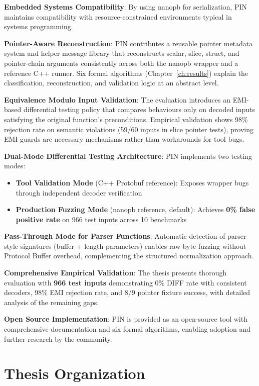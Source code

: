 \documentclass[doublespace,nopageskip]{VTthesis}
\begin{document}
\textbf{Embedded Systems Compatibility}: By using nanopb for serialization, PIN maintains compatibility with resource-constrained environments typical in systems programming.

\textbf{Pointer-Aware Reconstruction}: PIN contributes a reusable pointer metadata system and helper message library that reconstructs scalar, slice, struct, and pointer-chain arguments consistently across both the nanopb wrapper and a reference C++ runner. Six formal algorithms (Chapter~\ref{ch:results}) explain the classification, reconstruction, and validation logic at an abstract level.

\textbf{Equivalence Modulo Input Validation}: The evaluation introduces an EMI-based differential testing policy that compares behaviours only on decoded inputs satisfying the original function's preconditions. Empirical validation shows 98\% rejection rate on semantic violations (59/60 inputs in slice pointer tests), proving EMI guards are necessary mechanisms rather than workarounds for tool bugs.

\textbf{Dual-Mode Differential Testing Architecture}: PIN implements two testing modes:
\begin{itemize}
  \item \textbf{Tool Validation Mode} (C++ Protobuf reference): Exposes wrapper bugs through independent decoder verification
  \item \textbf{Production Fuzzing Mode} (nanopb reference, default): Achieves \textbf{0\% false positive rate} on 966 test inputs across 10 benchmarks
\end{itemize}

\textbf{Pass-Through Mode for Parser Functions}: Automatic detection of parser-style signatures (buffer + length parameters) enables raw byte fuzzing without Protocol Buffer overhead, complementing the structured normalization approach.

\textbf{Comprehensive Empirical Validation}: The thesis presents thorough evaluation with \textbf{966 test inputs} demonstrating 0\% DIFF rate with consistent decoders, 98\% EMI rejection rate, and 8/9 pointer fixture success, with detailed analysis of the remaining gaps.

  \textbf{Open Source Implementation}: PIN is provided as an open-source tool with comprehensive documentation and six formal algorithms, enabling adoption and further research by the community.

  \section{Thesis Organization} \label{se:thesis_organization}
\end{document}
